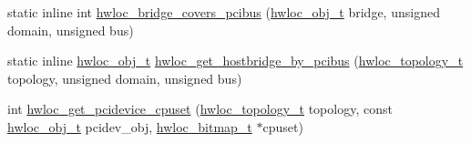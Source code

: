 \begin{DoxyCompactItemize}
\item 
static inline int \hyperlink{a00064_gaef22d6bf5cb0b7f13a863780126a8cb7}{hwloc\_\-bridge\_\-covers\_\-pcibus} (\hyperlink{a00016}{hwloc\_\-obj\_\-t} bridge, unsigned domain, unsigned bus)
\item 
static inline \hyperlink{a00016}{hwloc\_\-obj\_\-t} \hyperlink{a00064_ga81d4f68afbd68d94eb70d4f5c603eff5}{hwloc\_\-get\_\-hostbridge\_\-by\_\-pcibus} (\hyperlink{a00039_ga9d1e76ee15a7dee158b786c30b6a6e38}{hwloc\_\-topology\_\-t} topology, unsigned domain, unsigned bus)
\item 
 int \hyperlink{a00064_gaa3d6d84e49e97f7495cd0abbe466ffe3}{hwloc\_\-get\_\-pcidevice\_\-cpuset} (\hyperlink{a00039_ga9d1e76ee15a7dee158b786c30b6a6e38}{hwloc\_\-topology\_\-t} topology, const \hyperlink{a00016}{hwloc\_\-obj\_\-t} pcidev\_\-obj, \hyperlink{a00065_gaa3c2bf4c776d603dcebbb61b0c923d84}{hwloc\_\-bitmap\_\-t} $\ast$cpuset)
\end{DoxyCompactItemize}


